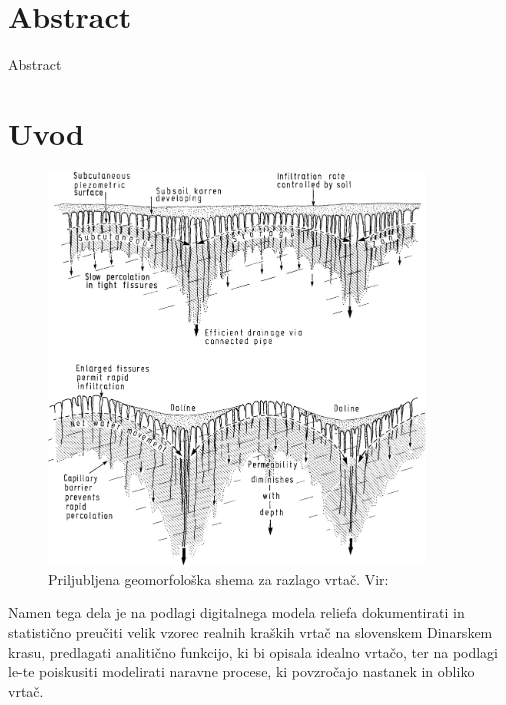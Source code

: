 \documentclass[a4paper, oneside, 12pt]{book}
\newcommand{\clearemptydoublepage}{\newpage{\pagestyle{empty}\cleardoublepage}}
\begin{document}
        \clearemptydoublepage

         
        \chapter*{Abstract}
        Abstract

        \clearemptydoublepage

        \mainmatter
        \setcounter{page}{1}
        \pagestyle{fancy}

        \chapter{Uvod}
        \label{uvod}

        \begin{figure}[H]
          \begin{center}
            \includegraphics[width=10cm]{slike/vrtaca-ford-williams}
          \end{center}
          \caption{Priljubljena geomorfološka shema za razlago vrtač. Vir: \cite{ford2007karst}}
          \label{fig:vrtaca-ford-williams}
        \end{figure}

        Namen tega dela je na podlagi digitalnega modela reliefa dokumentirati in statistično preučiti velik vzorec realnih kraških vrtač na slovenskem Dinarskem krasu, predlagati analitično funkcijo, ki bi opisala idealno vrtačo, ter na podlagi le-te poiskusiti modelirati naravne procese, ki povzročajo nastanek in obliko vrtač.
\end{document}
